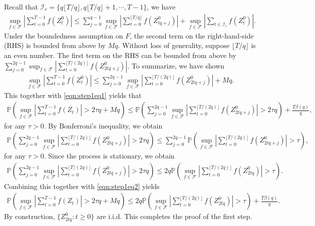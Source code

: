 \documentclass{article}
\newcommand{\prob}{{\mathbb{P}}}
\def\floor#1{\lfloor #1 \rfloor}
\begin{document}
Recall that $\mathcal{I}_r=\{q\floor{T/q},q\floor{T/q} +1, \cdots,T-1\}$, we have
\begin{eqnarray*}
	\sup_{f\in \mathcal{F}}\left|\sum_{t=0}^{T-1} f(Z_t^0)\right|\le \sum_{j=0}^{q-1}\sup_{f\in \mathcal{F}} \left|\sum_{t=0}^{\floor{T/q}} f(Z_{tq+j}^0)\right|+\sup_{f\in \mathcal{F}}\left|\sum_{t\in \mathcal{I}_r} f(Z_t^0)\right|.
\end{eqnarray*}
Under the boundedness assumption on $F$, the second term on the right-hand-side (RHS) is bounded from above by $Mq$. Without loss of generality, suppose $\floor{T/q}$ is an even number. The first term on the RHS can be bounded from above by $\sum_{j=0}^{2q-1}\sup_{f\in \mathcal{F}} |\sum_{t=0}^{\floor{T/(2q)}} f(Z_{2tq+j}^0)|$. To summarize, we have shown
\begin{eqnarray*}
	\sup_{f\in \mathcal{F}}\left|\sum_{t=0}^{T-1} f(Z_t^0)\right|\le \sum_{j=0}^{2q-1}\sup_{f\in \mathcal{F}} \left|\sum_{t=0}^{\floor{T/(2q)}} f(Z_{2tq+j}^0)\right|+Mq.
\end{eqnarray*}
This together with \eqref{eqn:step1eq1} yields that
\begin{eqnarray}\label{eqn:step1eq2}
	\prob\left(\sup_{f\in \mathcal{F}}\left|\sum_{t=0}^{T-1} f(Z_t)\right|>2\tau q+Mq\right)\le \prob\left(\sum_{j=0}^{2q-1}\sup_{f\in \mathcal{F}} \left|\sum_{t=0}^{\floor{T/(2q)}} f(Z_{2tq+j}^0)\right|>2\tau q\right)+\frac{T\beta(q)}{q},
\end{eqnarray}
for any $\tau>0$. By Bonferroni's inequality, we obtain
\begin{eqnarray*}
	\prob\left(\sum_{j=0}^{2q-1}\sup_{f\in \mathcal{F}} \left|\sum_{t=0}^{\floor{T/(2q)}} f(Z_{2tq+j}^0)\right|>2\tau q\right)\le \sum_{j=0}^{2q-1} \prob\left(\sup_{f\in \mathcal{F}} \left|\sum_{t=0}^{\floor{T/(2q)}} f(Z_{2tq+j}^0)\right|>\tau \right),
\end{eqnarray*}
for any $\tau>0$. Since the process is stationary, we obtain
\begin{eqnarray*}
	\prob\left(\sum_{j=0}^{2q-1}\sup_{f\in \mathcal{F}} \left|\sum_{t=0}^{\floor{T/(2q)}} f(Z_{2tq+j}^0)\right|>2\tau q\right)\le 2q \prob\left(\sup_{f\in \mathcal{F}} \left|\sum_{t=0}^{\floor{T/(2q)}} f(Z_{2tq}^0)\right|>\tau \right).
\end{eqnarray*}
Combining this together with \eqref{eqn:step1eq2} yields 
\begin{eqnarray}\label{eqn:step1eq3}
\prob\left(\sup_{f\in \mathcal{F}}\left|\sum_{t=0}^{T-1} f(Z_t)\right|>2\tau q+Mq\right)\le 2q \prob\left(\sup_{f\in \mathcal{F}} \left|\sum_{t=0}^{\floor{T/(2q)}} f(Z_{2tq}^0)\right|>\tau \right)+\frac{T\beta(q)}{q}.
\end{eqnarray}
By construction, $\{Z_{2tq}^0:t\ge 0\}$ are i.i.d. This completes the proof of the first step. 
\end{document}
